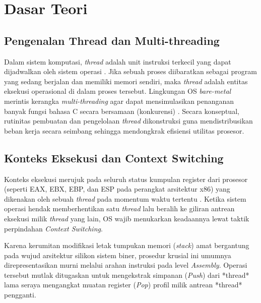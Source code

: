 \newpage
\section{Dasar Teori}

\subsection{Pengenalan Thread dan Multi-threading}
Dalam sistem komputasi, \textit{thread} adalah unit instruksi terkecil yang dapat dijadwalkan oleh sistem operasi \cite{Silberschatz2018}. Jika sebuah proses diibaratkan sebagai program yang sedang berjalan dan memiliki memori sendiri, maka \textit{thread} adalah entitas eksekusi operasional di dalam proses tersebut. Lingkungan OS \textit{bare-metal} merintis kerangka \textit{multi-threading} agar dapat mensimulasikan penanganan banyak fungsi bahasa C secara bersamaan (konkurensi) \cite{pintos_stanford}. Secara konseptual, rutinitas pembuatan dan pengelolaan \textit{thread} dikonstruksi guna mendistribusikan beban kerja secara seimbang sehingga mendongkrak efisiensi utilitas prosesor.

\subsection{Konteks Eksekusi dan Context Switching}
Konteks eksekusi merujuk pada seluruh status kumpulan register dari prosesor (seperti EAX, EBX, EBP, dan ESP pada perangkat arsitektur x86) yang dikenakan oleh sebuah \textit{thread} pada momentum waktu tertentu \cite{bryant2015computer}. Ketika sistem operasi hendak memberhentikan satu \textit{thread} lalu beralih ke giliran antrean eksekusi milik \textit{thread} yang lain, OS wajib menukarkan keadaannya lewat taktik perpindahan \textit{Context Switching}.

Karena kerumitan modifikasi letak tumpukan memori (\textit{stack}) amat bergantung pada wujud arsitektur silikon sistem biner, prosedur krusial ini umumnya direpresentasikan murni melalui arahan instruksi pada level \textit{Assembly}. Operasi tersebut mutlak ditugaskan untuk mengekstrak simpanan (\textit{Push}) dari *thread* lama seraya mengangkat muatan register (\textit{Pop}) profil milik antrean *thread* pengganti.

